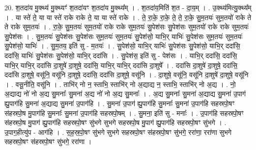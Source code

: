 \documentclass[17pt]{extarticle}
\begin{document}
20. श॒तदा॑य मु॒क्थ्य॑ मु॒क्थ्यꣳ॑ श॒तदा॑यꣳ श॒तदा॑य मु॒क्थ्य᳚म् । . श॒तदा॑य॒मिति॑ श॒त - दा॒य॒म् । . उ॒क्थ्य॑मित्यु॒क्थ्य᳚म् । . या स्ते॑ ते॒ या या स्ते॑ राके राके ते॒ या या स्ते॑ राके । . ते॒ रा॒के॒ रा॒के॒ ते॒ ते॒ रा॒के॒ सु॒म॒तयः॑ सुम॒तयो॑ राके ते ते राके सुम॒तयः॑ । . रा॒के॒ सु॒म॒तयः॑ सुम॒तयो॑ राके राके सुम॒तयः॑ सु॒पेश॑सः सु॒पेश॑सः सुम॒तयो॑ राके राके सुम॒तयः॑ सु॒पेश॑सः । . सु॒म॒तयः॑ सु॒पेश॑सः सु॒पेश॑सः सुम॒तयः॑ सुम॒तयः॑ सु॒पेश॑सो॒ याभि॒र् याभिः॑ सु॒पेश॑सः सुम॒तयः॑ सुम॒तयः॑ सु॒पेश॑सो॒ याभिः॑ । . सु॒म॒तय॒ इति॑ सु - म॒तयः॑ । . सु॒पेश॑सो॒ याभि॒र् याभिः॑ सु॒पेश॑सः सु॒पेश॑सो॒ याभि॒र् ददा॑सि॒ ददा॑सि॒ याभिः॑ सु॒पेश॑सः सु॒पेश॑सो॒ याभि॒र् ददा॑सि । . सु॒पेश॑स॒ इति॑ सु - पेश॑सः । . याभि॒र् ददा॑सि॒ ददा॑सि॒ याभि॒र् याभि॒र् ददा॑सि दा॒शुषे॑ दा॒शुषे॒ ददा॑सि॒ याभि॒र् याभि॒र् ददा॑सि दा॒शुषे᳚ । . ददा॑सि दा॒शुषे॑ दा॒शुषे॒ ददा॑सि॒ ददा॑सि दा॒शुषे॒ वसू॑नि॒ वसू॑नि दा॒शुषे॒ ददा॑सि॒ ददा॑सि दा॒शुषे॒ वसू॑नि । . दा॒शुषे॒ वसू॑नि॒ वसू॑नि दा॒शुषे॑ दा॒शुषे॒ वसू॑नि । . वसू॒नीति॒ वसू॑नि । . ताभि॑र् नो न॒ स्ताभि॒ स्ताभि॑र् नो अ॒द्याद्य न॒ स्ताभि॒ स्ताभि॑र् नो अ॒द्य । . नो॒ अ॒द्याद्य नो॑ नो अ॒द्य सु॒मनाः᳚ सु॒मना॑ अ॒द्य नो॑ नो अ॒द्य सु॒मनाः᳚ । . अ॒द्य सु॒मनाः᳚ सु॒मना॑ अ॒द्याद्य सु॒मना॑ उ॒पाग॑ ह्यु॒पाग॑हि सु॒मना॑ अ॒द्याद्य सु॒मना॑ उ॒पाग॑हि । . सु॒मना॑ उ॒पाग॑ ह्यु॒पाग॑हि सु॒मनाः᳚ सु॒मना॑ उ॒पाग॑हि सहस्रपो॒षꣳ स॑हस्रपो॒ष मु॒पाग॑हि सु॒मनाः᳚ सु॒मना॑ उ॒पाग॑हि सहस्रपो॒षम् । . सु॒मना॒ इति॑ सु - मनाः᳚ । . उ॒पाग॑हि सहस्रपो॒षꣳ स॑हस्रपो॒ष मु॒पाग॑ ह्यु॒पाग॑हि सहस्रपो॒षꣳ सु॑भगे सुभगे सहस्रपो॒ष मु॒पाग॑ ह्यु॒पाग॑हि सहस्रपो॒षꣳ सु॑भगे । . उ॒पाग॒हीत्यु॑प - आग॑हि । . स॒ह॒स्र॒पो॒षꣳ सु॑भगे सुभगे सहस्रपो॒षꣳ स॑हस्रपो॒षꣳ सु॑भगे॒ ररा॑णा॒ ररा॑णा सुभगे सहस्रपो॒षꣳ स॑हस्रपो॒षꣳ सु॑भगे॒ ररा॑णा । \newline
\end{document}
